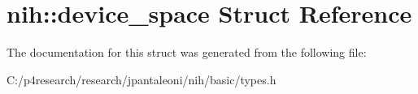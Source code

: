 \hypertarget{structnih_1_1device__space}{
\section{nih\-:\-:device\-\_\-space \-Struct \-Reference}
\label{structnih_1_1device__space}
}


\-The documentation for this struct was generated from the following file\-:\begin{DoxyCompactItemize}
\item 
\-C\-:/p4research/research/jpantaleoni/nih/basic/types.\-h\end{DoxyCompactItemize}
